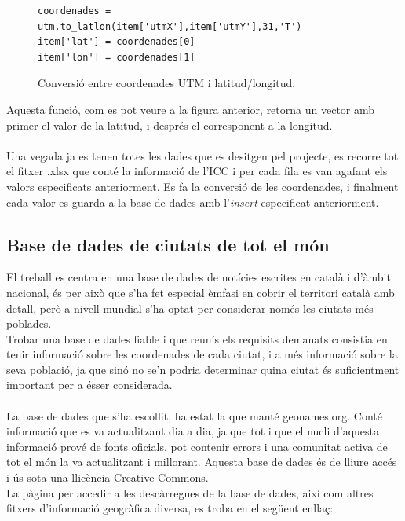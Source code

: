 \documentclass[12pt,a4paper,openright,oneside]{article}
\numberwithin{equation}{section}
\theoremstyle{definition}
\begin{document}
\begin{figure}[!htbp]
\begin{verbatim}
coordenades = utm.to_latlon(item['utmX'],item['utmY'],31,'T')
item['lat'] = coordenades[0]
item['lon'] = coordenades[1]
\end{verbatim}
\caption{Conversió entre coordenades UTM i latitud/longitud.}
\end{figure}
Aquesta funció, com es pot veure a la figura anterior, retorna un vector amb primer el valor de la latitud, i després el corresponent a la longitud.\\ \\
Una vegada ja es tenen totes les dades que es desitgen pel projecte, es recorre tot el fitxer .xlsx que conté la informació de l'ICC i per cada fila es van agafant els valors especificats anteriorment. Es fa la conversió de les coordenades, i finalment cada valor es guarda a la base de dades amb l'\emph{insert} especificat anteriorment.
\newpage
\subsection*{Base de dades de ciutats de tot el món}
El treball es centra en una base de dades de notícies escrites en català i d'àmbit nacional, és per això que s'ha fet especial èmfasi en cobrir el territori català amb detall, però a nivell mundial s'ha optat per considerar només les ciutats més poblades.\\
Trobar una base de dades fiable i que reunís els requisits demanats consistia en tenir informació sobre les coordenades de cada ciutat, i a més informació sobre la seva població, ja que sinó no se'n podria determinar quina ciutat és suficientment important per a ésser considerada.\\ \\
La base de dades que s'ha escollit, ha estat la que manté geonames.org. Conté informació que es va actualitzant dia a dia, ja que tot i que el nucli d'aquesta informació prové de fonts oficials,  pot contenir errors i una comunitat activa de tot el món la va actualitzant i millorant. Aquesta base de dades és de lliure accés i ús sota una llicència Creative Commons.\\
La pàgina per accedir a les descàrregues de la base de dades, així com altres fitxers d'informació geogràfica diversa, es troba en el següent enllaç:
\end{document}
